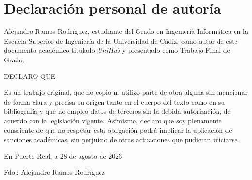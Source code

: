 \newpage{\ }
\thispagestyle{empty}

\clearpage\setcounter{page}{-1} %

\chapter*{Declaración personal de autoría}

\vspace{15mm}

\noindent Alejandro Ramos Rodríguez, estudiante del Grado en Ingeniería Informática en la Escuela Superior de Ingeniería de la Universidad de Cádiz, como autor de este documento académico titulado \textit{UniHub} y presentado como Trabajo Final de Grado.

\vspace{15mm}

DECLARO QUE \\
\vspace{1mm}

\noindent Es un trabajo original, que no copio ni utilizo parte de obra alguna sin mencionar de forma clara y precisa su origen tanto en el cuerpo del texto como en su bibliografía y que no empleo datos de terceros sin la debida autorización, de acuerdo con la legislación vigente. Asimismo, declaro que soy plenamente consciente de que no respetar esta obligación podrá implicar la aplicación de sanciones académicas, sin perjuicio de otras actuaciones que pudieran iniciarse.

\vspace{15mm}

En Puerto Real, a 28 de agosto de 2026

\vspace{15mm}
\begin{flushright}
Fdo.: Alejandro Ramos Rodríguez
\end{flushright}
